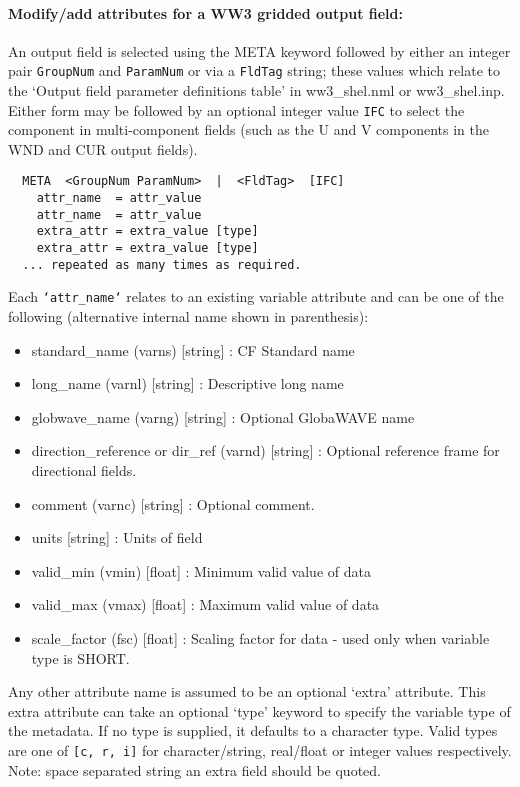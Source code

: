 \noindent
\paragraph{Modify/add attributes for a WW3 gridded output field:}

\noindent
An output field is selected using the META keyword followed by
either an integer pair \texttt{GroupNum} and \texttt{ParamNum}
or via a \texttt{FldTag} string; these values which relate to the
`Output field parameter definitions table' in ww3\_shel.nml
or ww3\_shel.inp.
Either form may be followed by an optional integer value \texttt{IFC}
to select the component in multi-component fields (such as the U and
V components in the WND and CUR output fields).

\begin{verbatim}
  META  <GroupNum ParamNum>  |  <FldTag>  [IFC]
    attr_name  = attr_value
    attr_name  = attr_value
    extra_attr = extra_value [type]
    extra_attr = extra_value [type]
  ... repeated as many times as required.
\end{verbatim}


\noindent
Each \texttt{`attr\_name`} relates to an existing variable attribute and
can be one of the following (alternative internal name shown in parenthesis):
\begin{itemize}
 \item  standard\_name (varns) [string] : CF Standard name
 \item  long\_name (varnl) [string] : Descriptive long name
 \item  globwave\_name (varng) [string] : Optional GlobaWAVE name
 \item  direction\_reference or dir\_ref (varnd) [string] : Optional reference
 frame for directional fields.
 \item  comment (varnc) [string] : Optional comment.
 \item  units [string] : Units of field
 \item  valid\_min (vmin) [float] : Minimum valid value of data
 \item  valid\_max (vmax) [float] : Maximum valid value of data
 \item  scale\_factor (fsc) [float] : Scaling factor for data - used only when
 variable type is SHORT.
\end{itemize}

\noindent
Any other attribute name is assumed to be an optional `extra'
attribute. This extra attribute can take an optional `type'
keyword to specify the variable type of the metadata. If
no type is supplied, it defaults to a character type. Valid
types are one of \texttt{[c, r, i]} for character/string,
real/float or integer values respectively. Note: space
separated string an extra field should be quoted.

